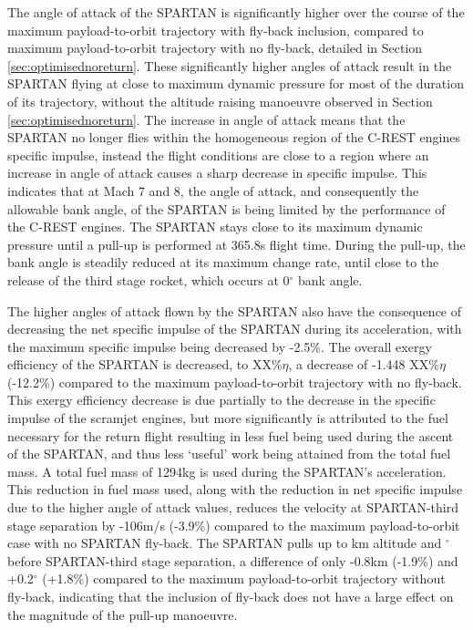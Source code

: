 The angle of attack of the SPARTAN is significantly higher over the course of the maximum payload-to-orbit trajectory with fly-back inclusion, compared to maximum payload-to-orbit trajectory with no fly-back, detailed in Section \ref{sec:optimisednoreturn}. 
 These significantly higher angles of attack result in the SPARTAN flying at close to maximum dynamic pressure for most of the duration of its trajectory, without the altitude raising manoeuvre observed in Section \ref{sec:optimisednoreturn}.
 The increase in angle of attack means that the SPARTAN no longer flies within the homogeneous region of the C-REST engines specific impulse, instead the flight conditions are close to a region where an increase in angle of attack causes a sharp decrease in specific impulse. 
This indicates that at Mach 7 and 8, the angle of attack, and consequently the allowable bank angle, of the SPARTAN is being limited by the performance of the C-REST engines. 
 The SPARTAN stays close to its maximum dynamic pressure until a pull-up is performed at 365.8s flight time. During the pull-up, the bank angle is steadily reduced at its maximum change rate, until close to the release of the third stage rocket, which occurs at 0$^\circ$ bank angle. 

The higher angles of attack flown by the SPARTAN also have the consequence of decreasing the net specific impulse of the SPARTAN during its acceleration, with the maximum specific impulse being decreased by -2.5\%.
The overall exergy efficiency of the SPARTAN is decreased, to \secondExergyEffStandard XX\%$\eta$, a decrease of -1.448 XX\%$\eta$ (-12.2\%) compared to the maximum payload-to-orbit trajectory with no fly-back. This exergy efficiency decrease is due partially to the decrease in the specific impulse of the scramjet engines, but more significantly is attributed to the fuel necessary for the return flight resulting in less fuel being used during the ascent of the SPARTAN, and thus less `useful' work being attained from the total fuel mass.
A total fuel mass of 1294kg is used during the SPARTAN's acceleration. This reduction in fuel mass used, along with the reduction in net specific impulse due to the higher angle of attack values, reduces the velocity at SPARTAN-third stage separation by -106m/s (-3.9\%) compared to the maximum payload-to-orbit case with no SPARTAN fly-back. The SPARTAN pulls up to \secondthirdSeparationAltStandard km altitude and \secondthirdSeparationgammaStandard $^\circ$ before SPARTAN-third stage separation, a difference of only -0.8km (-1.9\%) and +0.2$^\circ$ (+1.8\%) compared to the maximum payload-to-orbit trajectory without fly-back, indicating that the inclusion of fly-back does not have a large effect on the magnitude of the pull-up manoeuvre. 

